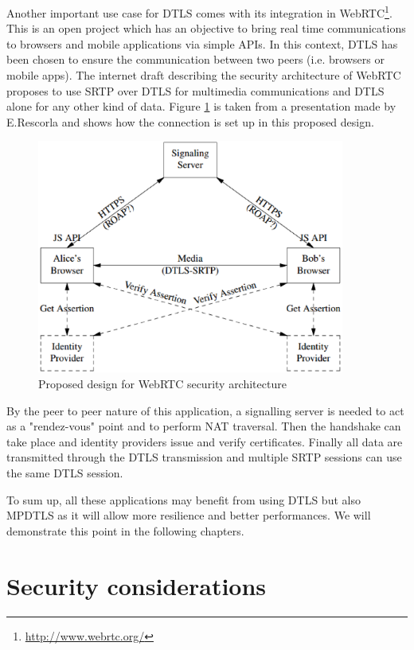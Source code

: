 Another important use case for DTLS comes with its integration in WebRTC\footnote{\url{http://www.webrtc.org/}}. This is an open project which has an objective to bring real time communications to browsers and mobile applications via simple APIs. In this context, DTLS has been chosen to ensure the communication between two peers (i.e. browsers or mobile apps). The internet draft describing the security architecture of WebRTC \cite{ietf-rtcweb-security-arch} proposes to use SRTP over DTLS for multimedia communications and DTLS alone for any other kind of data. Figure \ref{fig:webrtc} is taken from a presentation \cite{rescorla2011proposed} made by E.Rescorla and shows how the connection is set up in this proposed design.  

\begin{figure}[!ht]
\centering
\includegraphics[width=0.9\textwidth]{images/webrtc.eps}
\caption{Proposed design for WebRTC security architecture}
\label{fig:webrtc}
\end{figure}

By the peer to peer nature of this application, a signalling server is needed to act as a "rendez-vous" point and to perform NAT traversal. Then the handshake can take place and identity providers issue and verify certificates. Finally all data are transmitted through the DTLS transmission and multiple SRTP sessions can use the same DTLS session. 

To sum up, all these applications may benefit from using DTLS but also MPDTLS as it will allow more resilience and better performances. We will demonstrate this point in the following chapters.

\section{Security considerations}

